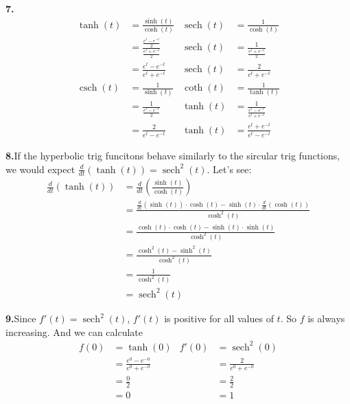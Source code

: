 \documentclass[10pt,oneside,]{book}
\theoremstyle{plain}
\theoremstyle{definition}
\numberwithin{equation}{section}
\newcommand{\fe}[2]{#1\mathopen{}\left(#2\right)\mathclose{}}
\newcommand{\fd}[1]{#1'}
\newcommand{\lzoo}[2]{{\frac{d}{d#1}}{\left(#2\right)}}
\newcommand{\sech}{\operatorname{sech}}
\newcommand{\csch}{\operatorname{csch}}
\begin{document}
\par\smallskip
\noindent\textbf{7.}\quad{}\begin{align*}
\fe{\tanh}{t}&=\frac{\fe{\sinh}{t}}{\fe{\cosh}{t}}&\fe{\sech}{t}&=\frac{1}{\fe{\cosh}{t}}\\
&=\frac{\frac{e^t-e^{-t}}{2}}{\frac{e^t+e^{-t}}{2}}&\fe{\sech}{t}&=\frac{1}{\frac{e^t+e^{-t}}{2}}\\
&=\frac{e^t-e^{-t}}{e^t+e^{-t}}&\fe{\sech}{t}&=\frac{2}{e^t+e^{-t}}\\
\fe{\csch}{t}&=\frac{1}{\fe{\sinh}{t}}&\fe{\coth}{t}&=\frac{1}{\fe{\tanh}{t}}\\
&=\frac{1}{\frac{e^t-e^{-t}}{2}}&\fe{\tanh}{t}&=\frac{1}{\frac{e^t-e^{-t}}{e^t+e^{-t}}}\\
&=\frac{2}{e^t-e^{-t}}&\fe{\tanh}{t}&=\frac{e^t+e^{-t}}{e^t-e^{-t}}
\end{align*}%
\par\smallskip
\noindent\textbf{8.}\quad{}If the hyperbolic trig funcitons behave similarly to the sircular trig functions, we would expect \(\lzoo{t}{\fe{\tanh}{t}}=\fe{\sech^2}{t}\). Let's see:\begin{align*}
\lzoo{t}{\fe{\tanh}{t}}&=\lzoo{t}{\frac{\fe{\sinh}{t}}{\fe{\cosh}{t}}}\\
&=\frac{\lzoo{t}{\fe{\sinh}{t}}\cdot\fe{\cosh}{t}-\fe{\sinh}{t}\cdot\lzoo{t}{\fe{\cosh}{t}}}{\fe{\cosh^2}{t}}\\
&=\frac{\fe{\cosh}{t}\cdot\fe{\cosh}{t}-\fe{\sinh}{t}\cdot\fe{\sinh}{t}}{\fe{\cosh^2}{t}}\\
&=\frac{\fe{\cosh^2}{t}-\fe{\sinh^2}{t}}{\fe{\cosh^2}{t}}\\
&=\frac{1}{\fe{\cosh^2}{t}}\\
&=\fe{\sech^2}{t}
\end{align*}%
\par\smallskip
\noindent\textbf{9.}\quad{}Since \(\fe{\fd{f}}{t}=\fe{\sech^2}{t}\), \(\fe{\fd{f}}{t}\) is positive for all values of \(t\). So \(f\) is always increasing. And we can calculate\begin{align*}
\fe{f}{0}&=\fe{\tanh}{0}&\fe{\fd{f}}{0}&=\fe{\sech^2}{0}\\
&=\frac{e^0-e^{-0}}{e^0+e^{-0}}&&=\frac{2}{e^0+e^{-0}}\\
&=\frac{0}{2}&&=\frac{2}{2}\\
&=0&&=1
\end{align*}%
\par\smallskip
\end{document}
